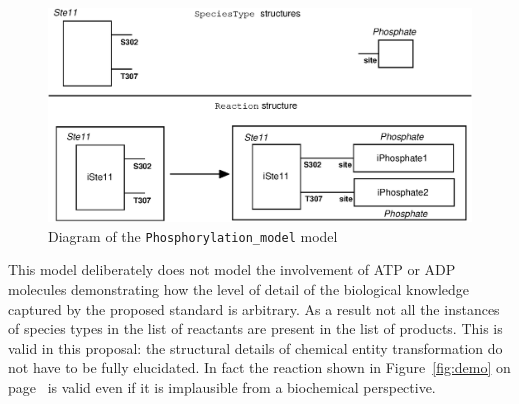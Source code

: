 \documentclass{cekarticle}
\begin{document}
\begin{figure}[h]
  \vspace*{8pt}
  \centering
  \includegraphics[scale = 0.7]{Phosphorylation-model.eps}
  \caption{Diagram of the \texttt{Phosphorylation\_model} model}
  \label{fig:Phosphorylation_model}
\end{figure}

This model deliberately does not model the involvement of ATP or ADP molecules demonstrating
how the level of detail of the biological knowledge captured by the proposed standard is arbitrary.
As a result not all the instances of species types in the list of reactants are present in the
list of products.  This is valid in this proposal: the structural details of chemical entity
transformation do not have to be fully elucidated.  In fact the reaction shown in
Figure~\ref{fig:demo} on page~\pageref{fig:demo} is valid even if it is implausible from a biochemical
perspective.
\end{document}
